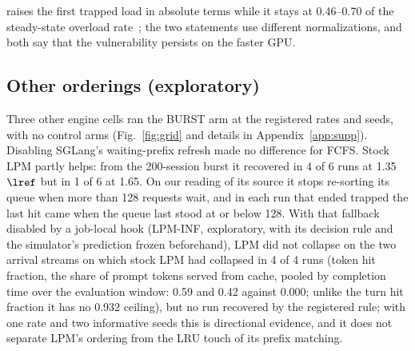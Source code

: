 raises the first trapped load in absolute terms while it stays at 0.46--0.70 of the steady-state overload rate~\citep{lu2026cachetrap}; the two statements use different normalizations, and both say that the vulnerability persists on the faster GPU.

\subsection{Other orderings (exploratory)}\label{sec:grid}
Three other engine cells ran the BURST arm at the registered rates and seeds, with no control arms (Fig.~\ref{fig:grid} and details in Appendix~\ref{app:supp}). Disabling SGLang's waiting-prefix refresh made no difference for FCFS. Stock LPM partly helps: from the 200-session burst it recovered in 4 of 6 runs at 1.35 $\lref$ but in 1 of 6 at 1.65. On our reading of its source it stops re-sorting its queue when more than 128 requests wait, and in each run that ended trapped the last hit came when the queue last stood at or below 128. With that fallback disabled by a job-local hook (LPM-INF, exploratory, with its decision rule and the simulator's prediction frozen beforehand), LPM did not collapse on the two arrival streams on which stock LPM had collapsed in 4 of 4 runs (token hit fraction, the share of prompt tokens served from cache, pooled by completion time over the evaluation window: 0.59 and 0.42 against 0.000; unlike the turn hit fraction it has no 0.932 ceiling), but no run recovered by the registered rule; with one rate and two informative seeds this is directional evidence, and it does not separate LPM's ordering from the LRU touch of its prefix matching.
